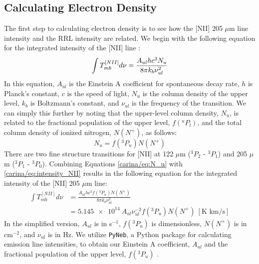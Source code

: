 \subsection{Calculating Electron Density}
The first step to calculating electron density is to see how the [NII] 205 $\mu$m line intensity and the RRL intensity are related.
We begin with the following equation for the integrated intensity of the [NII] line \parencite{pineda2019electron}:
\begin{equation}
    \label{carina/eq:intensity_NII}
    \int{T_{mb}^{[NII]}} d\nu = \frac{A_{ul}hc^3N_u}{8\pi k_b \nu_{ul}^2}\\
\end{equation}
In this equation, $A_{ul}$ is the Einstein A coefficient for spontaneous decay rate, $h$ is Planck's constant, $c$ is the speed of light, $N_u$ is the column density of the upper level, $k_b$ is Boltzmann's constant, and $\nu_{ul}$ is the frequency of the transition.
We can simply this further by noting that the upper-level column density, $N_u$, is related to the fractional population of the upper level, $f(^uP_l)$, and the total column density of ionized nitrogen, $N(N^+)$, as follows:
\begin{equation}
    N_u = f(^3P_u) N(N^+)
    \label{carina/eq:N_u}
\end{equation}
There are two fine structure transitions for [NII] at 122 $\mu$m ($^3P_2$ - $^3P_1$) and 205 $\mu$m ($^3P_1$ - $^3P_0$).
Combining Equations \ref{carina/eq:N_u} with \ref{carina/eq:intensity_NII} results in the following equation for the integrated intensity of the [NII] 205 $\mu$m line:
\begin{align}
    \int{T_{mb}^{[NII]}} d\nu &= \frac{A_{ul}hc^3f(^3P_u)N(N^+)}{8\pi k_b \nu_{ul}^2} \\
    &= \num{5.145e14}\ A_{ul}\nu_{ul}^{-2}f(^3P_u)N(N^+)\ [\text{K km/s}]
    \label{carina/eq:intensity_NII_final}
\end{align}
In the simplified version, $A_{ul}$ is in s$^{-1}$, $f(^3P_u)$ is dimensionless, $N(N^+)$ is in cm$^{-2}$, and $\nu_{ul}$ is in Hz.
We utilize \texttt{PyNeb}, a Python package for calculating emission line intensities, to obtain our Einstein A coefficient, $A_{ul}$ and the fractional population of the upper level, $f(^3P_u)$ \parencite{luridiana2015pyneb, froese2004breit,7288EL, tayal2011electron}.


